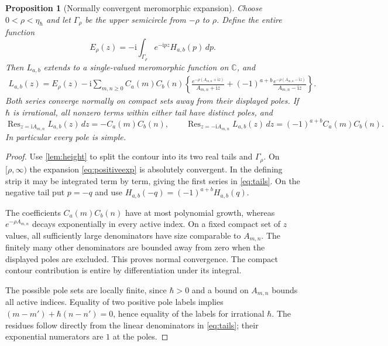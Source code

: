 \documentclass[11pt]{article}
\numberwithin{equation}{section}
\newtheorem{proposition}[proposition]{Proposition}
\theoremstyle{definition}
\theoremstyle{remark}
\newcommand{\C}{\mathbb C}
\newcommand{\dd}{\,d}
\newcommand{\ii}{\mathrm i}
\newcommand{\Res}{\operatorname{Res}}
\newcommand{\qh}{\hbar}
\begin{document}
\begin{proposition}[Normally convergent meromorphic expansion]\label{prop:tails}
Choose $0<\rho<\eta_{\qh}$ and let $\Gamma_\rho$ be the upper semicircle from
$-\rho$ to $\rho$. Define the entire function
\[
 E_\rho(z)=-\ii\int_{\Gamma_\rho}e^{-\ii pz}H_{a,b}(p)\dd p.
\]
Then $L_{a,b}$ extends to a single-valued meromorphic function on $\C$, and
\begin{equation}\label{eq:tails}
 \begin{split}
 L_{a,b}(z)=E_\rho(z)-\ii\sum_{m,n\geq0}C_a(m)C_b(n)
 \left\{
 \frac{e^{-\rho(A_{m,n}+\ii z)}}{A_{m,n}+\ii z}
 +(-1)^{a+b}\frac{e^{-\rho(A_{m,n}-\ii z)}}{A_{m,n}-\ii z}
 \right\}.
 \end{split}
\end{equation}
Both series converge normally on compact sets away from their displayed
poles. If $\qh$ is irrational, all nonzero terms within either tail have
distinct poles, and
\begin{equation}\label{eq:residues}
 \Res_{z=\ii A_{m,n}}L_{a,b}(z)\dd z=-C_a(m)C_b(n),\qquad
 \Res_{z=-\ii A_{m,n}}L_{a,b}(z)\dd z=(-1)^{a+b}C_a(m)C_b(n).
\end{equation}
In particular every pole is simple.
\end{proposition}
\begin{proof}
Use \cref{lem:height} to split the contour into its two real tails and
$\Gamma_\rho$. On $[\rho,\infty)$ the expansion \eqref{eq:positiveexp} is
absolutely convergent. In the defining strip it may be integrated term by
term, giving the first series in \eqref{eq:tails}. On the negative tail put
$p=-q$ and use $H_{a,b}(-q)=(-1)^{a+b}H_{a,b}(q)$.

The coefficients $C_a(m)C_b(n)$ have at most polynomial growth, whereas
$e^{-\rho A_{m,n}}$ decays exponentially in every active index. On a fixed
compact set of $z$ values, all sufficiently large denominators have size
comparable to $A_{m,n}$. The finitely many other denominators are bounded
away from zero when the displayed poles are excluded. This proves normal
convergence. The compact contour contribution is entire by differentiation
under its integral.

The possible pole sets are locally finite, since $\qh>0$ and a bound on
$A_{m,n}$ bounds all active indices. Equality of two positive pole labels
implies $(m-m')+\qh(n-n')=0$, hence equality of the labels for irrational
$\qh$. The residues follow directly from the linear denominators in
\eqref{eq:tails}; their exponential numerators are $1$ at the poles.
\end{proof}
\end{document}
